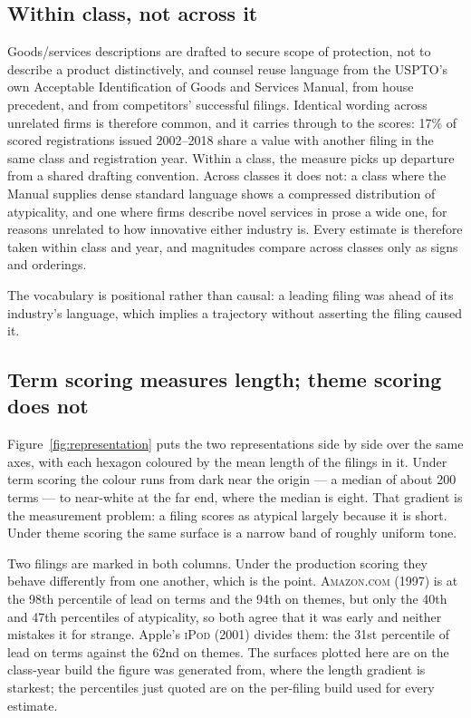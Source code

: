 \subsection{Within class, not across it}

Goods/services descriptions are drafted to secure scope of protection, not to
describe a product distinctively, and counsel reuse language from the USPTO's
own Acceptable Identification of Goods and Services Manual, from house
precedent, and from competitors' successful filings. Identical wording across
unrelated firms is therefore common, and it carries through to the scores:
17\% of scored registrations issued 2002--2018 share a value with another
filing in the same class and registration year. Within a class, the measure picks up departure from a shared
drafting convention. Across classes it does not: a class where the Manual
supplies dense standard language shows a compressed distribution of
atypicality, and one where firms describe novel services in prose a wide one,
for reasons unrelated to how innovative either industry is. Every estimate is
therefore taken within class and year, and magnitudes compare across classes
only as signs and orderings.

The vocabulary is positional rather than causal: a leading filing was
ahead of its industry's language, which implies a trajectory without
asserting the filing caused it.

\subsection{Term scoring measures length; theme scoring does not}\label{app:representation}

Figure~\ref{fig:representation} puts the two representations side by side
over the same axes, with each hexagon coloured by the mean length of the
filings in it. Under term scoring the colour runs from dark near the
origin --- a median of about 200 terms --- to near-white at the far end,
where the median is eight. That gradient is the measurement problem: a
filing scores as atypical largely because it is short. Under theme scoring
the same surface is a narrow band of roughly uniform tone.

Two filings are marked in both columns. Under the production scoring they
behave differently from one another, which is the point. \textsc{Amazon.com}
(1997) is at the 98th percentile of lead on terms and the 94th on themes,
but only the 40th and 47th
percentiles of atypicality, so both agree that it was early and neither
mistakes it for strange. Apple's \textsc{iPod} (2001) divides them: the 31st
percentile of lead on terms against the 62nd on themes. The surfaces plotted
here are on the class-year build the figure was generated from, where the
length gradient is starkest; the percentiles just quoted are on the per-filing
build used for every estimate.

